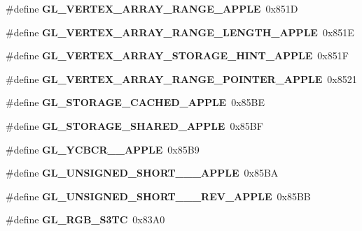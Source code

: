 \begin{DoxyCompactItemize}
\item 
\#define {\bfseries G\+L\+\_\+\+V\+E\+R\+T\+E\+X\+\_\+\+A\+R\+R\+A\+Y\+\_\+\+R\+A\+N\+G\+E\+\_\+\+A\+P\+P\+L\+E}~0x851\+D\label{_s_d_l__opengl_8h_ad958f6a291e413035af8ff433f4aa3a1}

\item 
\#define {\bfseries G\+L\+\_\+\+V\+E\+R\+T\+E\+X\+\_\+\+A\+R\+R\+A\+Y\+\_\+\+R\+A\+N\+G\+E\+\_\+\+L\+E\+N\+G\+T\+H\+\_\+\+A\+P\+P\+L\+E}~0x851\+E\label{_s_d_l__opengl_8h_a2c169af9ff0bb35239853e216f17d070}

\item 
\#define {\bfseries G\+L\+\_\+\+V\+E\+R\+T\+E\+X\+\_\+\+A\+R\+R\+A\+Y\+\_\+\+S\+T\+O\+R\+A\+G\+E\+\_\+\+H\+I\+N\+T\+\_\+\+A\+P\+P\+L\+E}~0x851\+F\label{_s_d_l__opengl_8h_a46dd6e11e4f816f6218ed0f93221e8fa}

\item 
\#define {\bfseries G\+L\+\_\+\+V\+E\+R\+T\+E\+X\+\_\+\+A\+R\+R\+A\+Y\+\_\+\+R\+A\+N\+G\+E\+\_\+\+P\+O\+I\+N\+T\+E\+R\+\_\+\+A\+P\+P\+L\+E}~0x8521\label{_s_d_l__opengl_8h_a523cca0ad710c291be34e02b09bf6698}

\item 
\#define {\bfseries G\+L\+\_\+\+S\+T\+O\+R\+A\+G\+E\+\_\+\+C\+A\+C\+H\+E\+D\+\_\+\+A\+P\+P\+L\+E}~0x85\+B\+E\label{_s_d_l__opengl_8h_a90d485c73018097d46f0ba8046ed9020}

\item 
\#define {\bfseries G\+L\+\_\+\+S\+T\+O\+R\+A\+G\+E\+\_\+\+S\+H\+A\+R\+E\+D\+\_\+\+A\+P\+P\+L\+E}~0x85\+B\+F\label{_s_d_l__opengl_8h_ae3cb8456fa7098889c154bb688b01d42}

\item 
\#define {\bfseries G\+L\+\_\+\+Y\+C\+B\+C\+R\+\_\+\_\+\+A\+P\+P\+L\+E}~0x85\+B9\label{_s_d_l__opengl_8h_afe87839802db199a51e631973ce4b372}

\item 
\#define {\bfseries G\+L\+\_\+\+U\+N\+S\+I\+G\+N\+E\+D\+\_\+\+S\+H\+O\+R\+T\+\_\+\_\+\_\+\+A\+P\+P\+L\+E}~0x85\+B\+A\label{_s_d_l__opengl_8h_a47e947dccaaa6226f8bbbbffff8f2348}

\item 
\#define {\bfseries G\+L\+\_\+\+U\+N\+S\+I\+G\+N\+E\+D\+\_\+\+S\+H\+O\+R\+T\+\_\+\_\+\_\+\+R\+E\+V\+\_\+\+A\+P\+P\+L\+E}~0x85\+B\+B\label{_s_d_l__opengl_8h_ad15f8255cc6948b1a479c44f5a27a904}

\item 
\#define {\bfseries G\+L\+\_\+\+R\+G\+B\+\_\+\+S3\+T\+C}~0x83\+A0\label{_s_d_l__opengl_8h_a826cb6cedeae03e7e5c53d7700524dac}


\end{DoxyCompactItemize}

